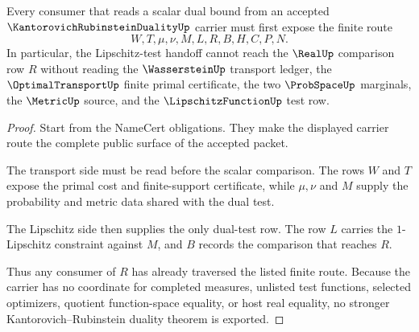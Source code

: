 \begin{theorem}
\label{thm:kantorovich-rubinstein-duality-lipschitz-test-handoff}
Every consumer that reads a scalar dual bound from an accepted $\KantorovichRubinsteinDualityUp$ carrier must first expose the finite route
$$
W,T,\mu,\nu,M,L,R,B,H,C,P,N.
$$
In particular, the Lipschitz-test handoff cannot reach the $\RealUp$ comparison row $R$ without reading the $\WassersteinUp$ transport ledger, the $\OptimalTransportUp$ finite primal certificate, the two $\ProbSpaceUp$ marginals, the $\MetricUp$ source, and the $\LipschitzFunctionUp$ test row.
\end{theorem}
\begin{proof}
Start from the NameCert obligations. They make the displayed carrier route the complete public surface of the accepted packet.

The transport side must be read before the scalar comparison. The rows $W$ and $T$ expose the primal cost and finite-support certificate, while $\mu,\nu$ and $M$ supply the probability and metric data shared with the dual test.

The Lipschitz side then supplies the only dual-test row. The row $L$ carries the $1$-Lipschitz constraint against $M$, and $B$ records the comparison that reaches $R$.

Thus any consumer of $R$ has already traversed the listed finite route. Because the carrier has no coordinate for completed measures, unlisted test functions, selected optimizers, quotient function-space equality, or host real equality, no stronger Kantorovich--Rubinstein duality theorem is exported.
\end{proof}




